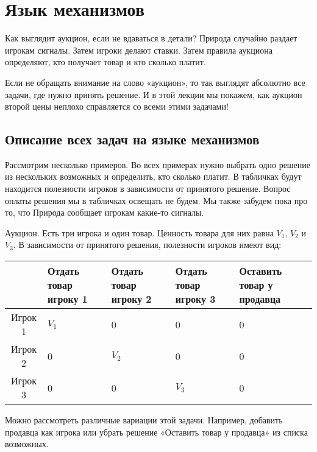 \chapter{Язык механизмов}
Как выглядит аукцион, если не вдаваться в детали? Природа случайно раздает игрокам сигналы. Затем игроки делают ставки. Затем правила аукциона определяют, кто получает товар и кто сколько платит.

Если не обращать внимание на слово «аукцион», то так выглядят абсолютно все задачи, где нужно принять решение. И в этой лекции мы покажем, как аукцион второй цены неплохо справляется со всеми этими задачами!





\section{Описание всех задач на языке механизмов}

Рассмотрим несколько примеров. Во всех примерах нужно выбрать одно решение из нескольких возможных и определить, кто сколько платит. В табличках будут находится полезности игроков в зависимости от принятого решение. Вопрос оплаты решения мы в табличках освещать не будем. Мы также забудем пока про то, что Природа сообщает игрокам какие-то сигналы.


\begin{myex} Аукцион. Есть три игрока и один товар. Ценность товара для них равна $ V_{1} $, $ V_{2} $ и $ V_{3} $. В зависимости от принятого решения, полезности игроков имеют вид:

\begin{tabular}{c|p{2.2 cm}p{2.2 cm}p{2.2 cm}p{2.2 cm}}
& Отдать товар игроку 1 & Отдать товар игроку 2 & Отдать товар игроку 3 & Оставить товар у продавца \\
\hline
Игрок 1 & $ V_{1} $ & 0 & 0 & 0\\
Игрок 2 & 0 & $ V_{2} $ & 0 & 0\\
Игрок 3 & 0 & 0 & $ V_{3} $ & 0\\
\end{tabular}

Можно рассмотреть различные вариации этой задачи. Например, добавить продавца как игрока или убрать решение «Оставить товар у продавца» из списка возможных.

\end{myex}


